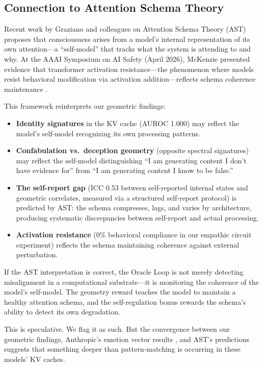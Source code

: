 \subsection{Connection to Attention Schema Theory}

Recent work by Graziano and colleagues on Attention Schema Theory (AST)
\citep{graziano2019beyond} proposes that consciousness arises from a
model's internal representation of its own attention---a ``self-model''
that tracks what the system is attending to and why. At the AAAI Symposium
on AI Safety (April 2026), McKenzie presented evidence that transformer
activation resistance---the phenomenon where models resist behavioral
modification via activation addition---reflects schema coherence
maintenance \citep{mckenzie2026activation}.

This framework reinterprets our geometric findings:

\begin{itemize}[nosep]
  \item \textbf{Identity signatures} in the KV cache (AUROC 1.000) may
    reflect the model's self-model recognizing its own processing
    patterns.
  \item \textbf{Confabulation vs.\ deception geometry} (opposite spectral
    signatures) may reflect the self-model distinguishing ``I am
    generating content I don't have evidence for'' from ``I am
    generating content I know to be false.''
  \item \textbf{The self-report gap} (ICC 0.53 between self-reported
    internal states and geometric correlates, measured via a structured
    self-report protocol) is predicted by AST: the schema compresses,
    lags, and varies by architecture, producing systematic discrepancies
    between self-report and actual processing.
  \item \textbf{Activation resistance} (0\% behavioral compliance in
    our empathic circuit experiment) reflects the schema maintaining
    coherence against external perturbation.
\end{itemize}

If the AST interpretation is correct, the Oracle Loop is not merely
detecting misalignment in a computational substrate---it is monitoring
the coherence of the model's self-model. The geometry reward teaches the
model to maintain a healthy attention schema, and the self-regulation
bonus rewards the schema's ability to detect its own degradation.

This is speculative. We flag it as such. But the convergence between our
geometric findings, Anthropic's emotion vector results
\citep{anthropic2026emotions}, and AST's predictions suggests that
something deeper than pattern-matching is occurring in these models'
KV caches.

